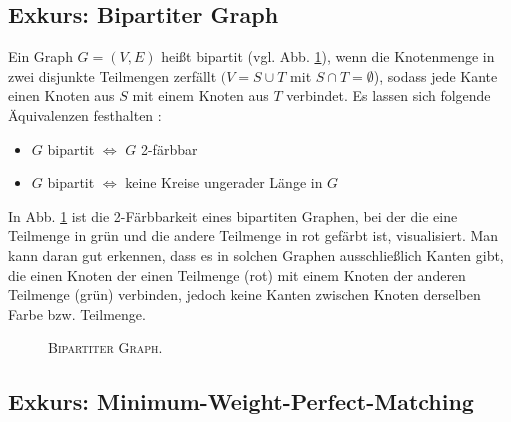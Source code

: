 \subsection{Exkurs: Bipartiter Graph}
\label{sec:digression_bipartite_graph}

Ein Graph $G = (V, E)$ heißt bipartit (vgl. Abb. \ref{fig:digression_bipartite_graph}), wenn die Knotenmenge in zwei disjunkte Teilmengen zerfällt
$(V = S \cup T$ mit $S \cap T = \emptyset$), sodass jede Kante einen Knoten aus $S$ mit einem Knoten aus $T$ verbindet. \cite{HochschuleDarmstadt}\newline
Es lassen sich folgende Äquivalenzen festhalten \cite{Leighton2010}:
\begin{itemize}
  \item $G$ bipartit $\iff$ $G$ 2-färbbar
  \item $G$ bipartit $\iff$ keine Kreise ungerader Länge in $G$
\end{itemize}
In Abb. \ref{fig:digression_bipartite_graph} ist die 2-Färbbarkeit eines bipartiten Graphen, bei der die eine Teilmenge
in grün und die andere Teilmenge in rot gefärbt ist, visualisiert. Man kann daran gut erkennen, dass es in solchen Graphen
ausschließlich Kanten gibt, die einen Knoten der einen Teilmenge (rot) mit einem Knoten der anderen Teilmenge (grün) verbinden,
jedoch keine Kanten zwischen Knoten derselben Farbe bzw. Teilmenge.

\begin{figure}[H]
\centering
{}
\caption{\textsc{Bipartiter Graph.}}
\label{fig:digression_bipartite_graph}
\end{figure}

\subsection{Exkurs: Minimum-Weight-Perfect-Matching}
\label{sec:digression_mwpm}

